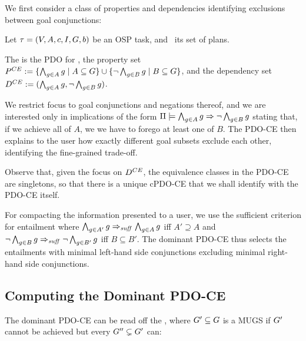 We first consider a class of properties and dependencies identifying
exclusions between goal conjunctions:

\begin{definition}
Let $\tau =
(V,\allowbreak A,\allowbreak{\ensuremath{c}},\allowbreak I,\allowbreak G,\allowbreak{\ensuremath{b}})$
be an OSP task, and \plans\ its set of plans.  

The  is the PDO for
\plans, the property set $P^{CE} := \{\bigwedge_{g \in A}
g\allowbreak\mid\allowbreak A \subseteq G\} \cup \{\neg \bigwedge_{g
  \in B} g \allowbreak\mid\allowbreak B \subseteq G\}$, and the
dependency set $D^{CE} := (\bigwedge_{g \in A} g,\allowbreak\neg
\bigwedge_{g \in B} g)$.
\end{definition}

We restrict focus to goal conjunctions and negations thereof, and we
are interested only in implications of the form
$\Pi \models \bigwedge_{g \in A} g \Rightarrow \neg \bigwedge_{g \in B} g$
stating that, if we achieve all of $A$, we we have to forego at least
one of $B$. The PDO-CE then explains to the user how exactly different
goal subsets exclude each other, identifying the fine-grained
trade-off.

Observe that, given the focus on $D^{CE}$, the equivalence classes
in the PDO-CE are singletons, so that there is a unique cPDO-CE that
we shall identify with the PDO-CE itself.

For compacting the information presented to a user, we use the
sufficient criterion for entailment where $\bigwedge_{g \in A'} g
\Rightarrow_{\mathit{suff}} \bigwedge_{g \in A} g$ iff $A' \supseteq A$ and $\neg
\bigwedge_{g \in B} g \Rightarrow_{\mathit{suff}} \neg \bigwedge_{g \in B'} g$ iff $B
\subseteq B'$. The dominant PDO-CE thus selects the entailments with
minimal left-hand side conjunctions excluding minimal right-hand side
conjunctions.
%




\subsection{Computing the Dominant PDO-CE}
\label{goaldep:computing}

The dominant PDO-CE can be read off the , where $G' \subseteq G$ is a MUGS if
$G'$ cannot be achieved but every $G'' \subsetneq G'$ can:

